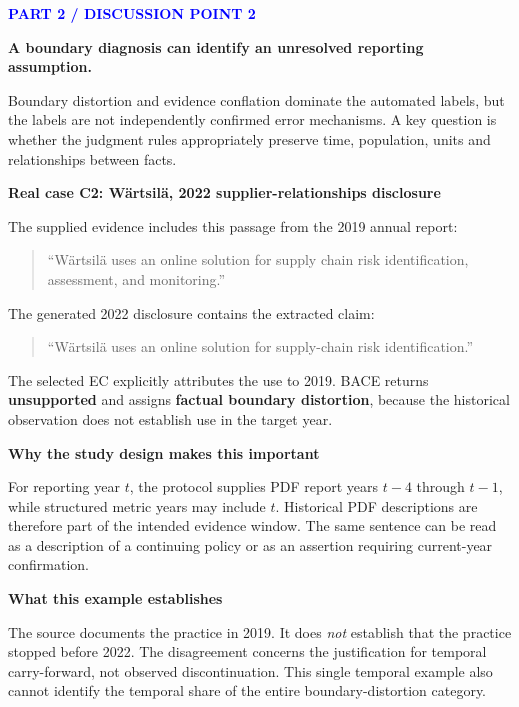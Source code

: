 \documentclass[11pt,a4paper]{article}
\newcommand{\pagetitle}[2]{\textcolor{blue}{\small\bfseries #1}\par\vspace{2pt}{\LARGE\bfseries #2\par}\vspace{5pt}}
\newcommand{\lead}[1]{{\large\bfseries #1}\par}
\newcommand{\subhead}[1]{\vspace{5pt}\textbf{#1}\par}
\newcommand{\quoted}[1]{\begin{quote}\small ``#1''\end{quote}}
\begin{document}
\newpage
\pagetitle{PART 2 / DISCUSSION POINT 2}{What do the dominant diagnoses mean?}
\lead{A boundary diagnosis can identify an unresolved reporting assumption.}

Boundary distortion and evidence conflation dominate the automated labels, but the labels are not independently confirmed error mechanisms. A key question is whether the judgment rules appropriately preserve time, population, units and relationships between facts.

\subhead{Real case C2: W\"artsil\"a, 2022 supplier-relationships disclosure}
The supplied evidence includes this passage from the 2019 annual report:
\quoted{W\"artsil\"a uses an online solution for supply chain risk identification, assessment, and monitoring.}
The generated 2022 disclosure contains the extracted claim:
\quoted{W\"artsil\"a uses an online solution for supply-chain risk identification.}
The selected EC explicitly attributes the use to 2019. BACE returns \textbf{unsupported} and assigns \textbf{factual boundary distortion}, because the historical observation does not establish use in the target year.

\begin{center}
\end{center}

\subhead{Why the study design makes this important}
For reporting year $t$, the protocol supplies PDF report years $t-4$ through $t-1$, while structured metric years may include $t$. Historical PDF descriptions are therefore part of the intended evidence window. The same sentence can be read as a description of a continuing policy or as an assertion requiring current-year confirmation.

\subhead{What this example establishes}
The source documents the practice in 2019. It does \emph{not} establish that the practice stopped before 2022. The disagreement concerns the justification for temporal carry-forward, not observed discontinuation. This single temporal example also cannot identify the temporal share of the entire boundary-distortion category.
\end{document}
